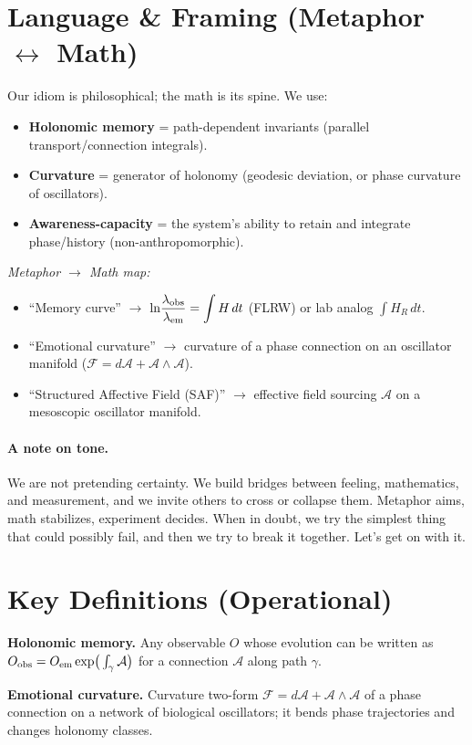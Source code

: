 \documentclass[11pt]{article}
\begin{document}
\section{Language \& Framing (Metaphor $\leftrightarrow$ Math)}
Our idiom is philosophical; the math is its spine. We use:
\begin{itemize}
  \item \textbf{Holonomic memory} = path-dependent invariants (parallel transport/connection integrals).
  \item \textbf{Curvature} = generator of holonomy (geodesic deviation, or phase curvature of oscillators).
  \item \textbf{Awareness-capacity} = the system's ability to retain and integrate phase/history (non-anthropomorphic).
\end{itemize}
\textit{Metaphor $\to$ Math map:}
\begin{itemize}
  \item ``Memory curve'' $\to$ $\displaystyle \ln\!\frac{\lambda_{\rm obs}}{\lambda_{\rm em}}=\int H\,dt$ (FLRW) or lab analog $\int H_R\,dt$.
  \item ``Emotional curvature'' $\to$ curvature of a phase connection on an oscillator manifold ($\mathcal{F}=d\mathcal{A}+\mathcal{A}\wedge\mathcal{A}$).
  \item ``Structured Affective Field (SAF)'' $\to$ effective field sourcing $\mathcal{A}$ on a mesoscopic oscillator manifold.
\end{itemize}
\paragraph{A note on tone.}
We are not pretending certainty. We build bridges between feeling, mathematics, and measurement, and we invite others to cross or collapse them.
Metaphor aims, math stabilizes, experiment decides. When in doubt, we try the simplest thing that could possibly fail, and then we try to break it together.
Let's get on with it.

\section{Key Definitions (Operational)}
\textbf{Holonomic memory.} Any observable $O$ whose evolution can be written as
$O_{\rm obs}=O_{\rm em}\exp\!\big(\int_\gamma \mathcal{A}\big)$ for a connection $\mathcal{A}$ along path $\gamma$.
\smallskip

\noindent
\textbf{Emotional curvature.} Curvature two-form $\mathcal{F}=d\mathcal{A}+\mathcal{A}\wedge\mathcal{A}$ of a phase connection
on a network of biological oscillators; it bends phase trajectories and changes holonomy classes.
\smallskip
\end{document}
